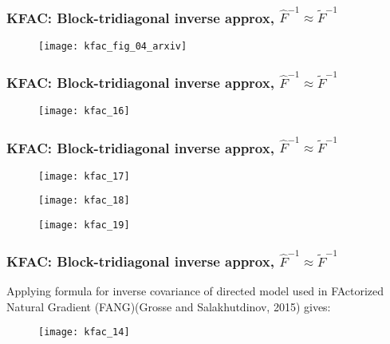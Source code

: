 \begin{frame}
\frametitle{KFAC: Block-tridiagonal inverse approx, $\hat{F}^{-1} \approx \tilde{F}^{-1}$}
\begin{figure}
    \centering
    \texttt{[image: kfac\_fig\_04\_arxiv]}
\end{figure}
\end{frame}

\begin{frame}
\frametitle{KFAC: Block-tridiagonal inverse approx, $\hat{F}^{-1} \approx \tilde{F}^{-1}$}
\begin{figure}
    \centering
    \texttt{[image: kfac\_16]}
\end{figure}

\end{frame}

\begin{frame}
\frametitle{KFAC: Block-tridiagonal inverse approx, $\hat{F}^{-1} \approx \tilde{F}^{-1}$}
\begin{figure}
    \centering
    \texttt{[image: kfac\_17]}
\end{figure}

\begin{figure}
    \centering
    \texttt{[image: kfac\_18]}
\end{figure}
\begin{figure}
    \centering
    \texttt{[image: kfac\_19]}
\end{figure}
\end{frame}

\begin{frame}
\frametitle{KFAC: Block-tridiagonal inverse approx, $\hat{F}^{-1} \approx \tilde{F}^{-1}$}
Applying formula for inverse covariance of directed model used in FActorized Natural Gradient (FANG)(Grosse and Salakhutdinov, 2015)
gives:

\begin{figure}
    \centering
    \texttt{[image: kfac\_14]}
\end{figure}

\end{frame}


